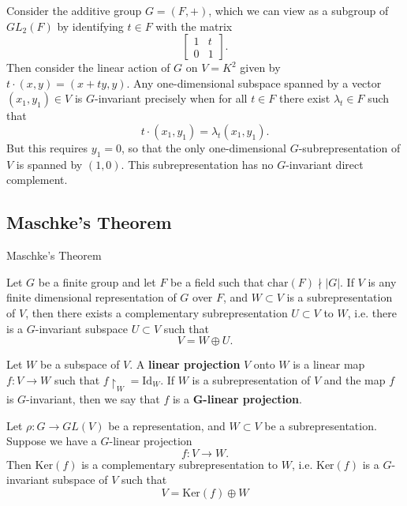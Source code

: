 \begin{frame}[plain]
\begin{example}
Consider the additive group $G = (F, +)$, which we can view as a subgroup of $GL_2 (F)$ by identifying $t \in F$ with the matrix 
\[ \begin{bmatrix} 1 & t \\ 0 & 1 \end{bmatrix}.\]
Then consider the linear action of $G$ on $V = K^2$ given by $t \cdot (x, y) = (x + ty, y)$. Any one-dimensional subspace spanned by a vector $(x_1, y_1) \in V$ is $G$-invariant precisely when for all $t \in F$ there exist $\lambda_t \in F$ such that \[ t \cdot (x_1, y_1) = \lambda_t (x_1, y_1). \]  But this requires $y_1=0$, so that the only one-dimensional $G$-subrepresentation of $V$ is spanned by $(1,0)$. This subrepresentation has no $G$-invariant direct complement. 
\end{example}
\end{frame}

\subsection{Maschke's Theorem}
\begin{frame}{Maschke's Theorem}
\begin{theorem}
Let $G$ be a finite group and let $F$ be a field such that $\text{char}(F) \nmid |G|$.  If $V$ is any finite dimensional representation of $G$ over $F$, and $W \subset V$ is a subrepresentation of $V$, then there exists a complementary subrepresentation $U \subset V$ to $W$, i.e. there is  a $G$-invariant subspace $U \subset V$ such that 
\[ V = W \oplus U. \]
\end{theorem}
\end{frame}

\begin{frame}
\begin{definition}
Let $W$ be a subspace of $V$.  A \textbf{linear projection} $V$ onto $W$ is a linear map $f \colon V \to W$ such that $f \restriction_{W} = \text{Id}_W$.  If $W$ is a subrepresentation of $V$ and the map $f$ is $G$-invariant, then we say that $f$ is a $\mathbf{G}$\textbf{-linear projection}.
\end{definition}
\begin{lemma} \label{maschke-lemma}
Let $\rho \colon G \to GL(V)$ be a representation, and $W \subset V$ be a subrepresentation.  Suppose we have a $G$-linear projection 
\[ f \colon V \to W. \]
Then $\text{Ker}(f)$ is a complementary subrepresentation to $W$, i.e. $\text{Ker}(f)$ is a $G$-invariant subspace of $V$ such that
\[ V = \text{Ker}(f) \oplus W \]
\end{lemma}
\end{frame}

